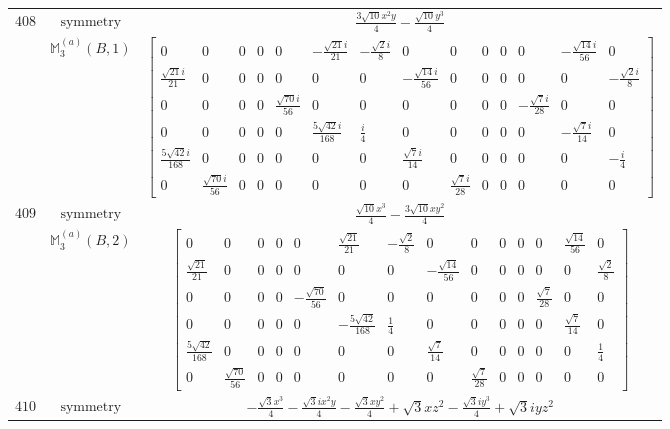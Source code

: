 \documentclass[fleqn,8pt,landscape]{jsarticle}
\begin{document}
\begin{longtable}{ccc}
$ 408 $ & $ \text{symmetry} $ & $ \frac{3 \sqrt{10} x^{2} y}{4} - \frac{\sqrt{10} y^{3}}{4} $ \\
$  $ & $ \mathbb{M}_{3}^{(a)}(B,1) $ & $ \begin{bmatrix} 0 & 0 & 0 & 0 & 0 & - \frac{\sqrt{21} i}{21} & - \frac{\sqrt{2} i}{8} & 0 & 0 & 0 & 0 & 0 & - \frac{\sqrt{14} i}{56} & 0 \\ \frac{\sqrt{21} i}{21} & 0 & 0 & 0 & 0 & 0 & 0 & - \frac{\sqrt{14} i}{56} & 0 & 0 & 0 & 0 & 0 & - \frac{\sqrt{2} i}{8} \\ 0 & 0 & 0 & 0 & \frac{\sqrt{70} i}{56} & 0 & 0 & 0 & 0 & 0 & 0 & - \frac{\sqrt{7} i}{28} & 0 & 0 \\ 0 & 0 & 0 & 0 & 0 & \frac{5 \sqrt{42} i}{168} & \frac{i}{4} & 0 & 0 & 0 & 0 & 0 & - \frac{\sqrt{7} i}{14} & 0 \\ \frac{5 \sqrt{42} i}{168} & 0 & 0 & 0 & 0 & 0 & 0 & \frac{\sqrt{7} i}{14} & 0 & 0 & 0 & 0 & 0 & - \frac{i}{4} \\ 0 & \frac{\sqrt{70} i}{56} & 0 & 0 & 0 & 0 & 0 & 0 & \frac{\sqrt{7} i}{28} & 0 & 0 & 0 & 0 & 0 \end{bmatrix} $ \\ \hline
$ 409 $ & $ \text{symmetry} $ & $ \frac{\sqrt{10} x^{3}}{4} - \frac{3 \sqrt{10} x y^{2}}{4} $ \\
$  $ & $ \mathbb{M}_{3}^{(a)}(B,2) $ & $ \begin{bmatrix} 0 & 0 & 0 & 0 & 0 & \frac{\sqrt{21}}{21} & - \frac{\sqrt{2}}{8} & 0 & 0 & 0 & 0 & 0 & \frac{\sqrt{14}}{56} & 0 \\ \frac{\sqrt{21}}{21} & 0 & 0 & 0 & 0 & 0 & 0 & - \frac{\sqrt{14}}{56} & 0 & 0 & 0 & 0 & 0 & \frac{\sqrt{2}}{8} \\ 0 & 0 & 0 & 0 & - \frac{\sqrt{70}}{56} & 0 & 0 & 0 & 0 & 0 & 0 & \frac{\sqrt{7}}{28} & 0 & 0 \\ 0 & 0 & 0 & 0 & 0 & - \frac{5 \sqrt{42}}{168} & \frac{1}{4} & 0 & 0 & 0 & 0 & 0 & \frac{\sqrt{7}}{14} & 0 \\ \frac{5 \sqrt{42}}{168} & 0 & 0 & 0 & 0 & 0 & 0 & \frac{\sqrt{7}}{14} & 0 & 0 & 0 & 0 & 0 & \frac{1}{4} \\ 0 & \frac{\sqrt{70}}{56} & 0 & 0 & 0 & 0 & 0 & 0 & \frac{\sqrt{7}}{28} & 0 & 0 & 0 & 0 & 0 \end{bmatrix} $ \\ \hline
$ 410 $ & $ \text{symmetry} $ & $ - \frac{\sqrt{3} x^{3}}{4} - \frac{\sqrt{3} i x^{2} y}{4} - \frac{\sqrt{3} x y^{2}}{4} + \sqrt{3} x z^{2} - \frac{\sqrt{3} i y^{3}}{4} + \sqrt{3} i y z^{2} $ \\

\end{longtable}
\end{document}
